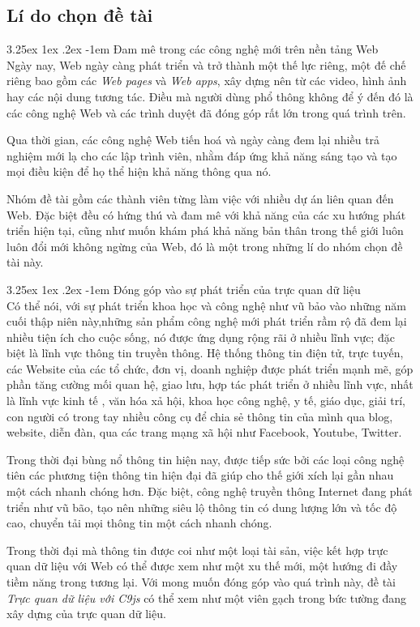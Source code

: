 \documentclass[12pt,a4paper,twoside]{article}
\makeatletter
\newcommand{\myparagraph}[1]{\paragraph{#1}\mbox{}\\} %
\renewcommand\paragraph{\@startsection{paragraph}{5}{\z@}%
  {3.25ex \@plus1ex \@minus.2ex}%
  {-1em}%
  {\normalfont\normalsize\bfseries}}
\makeatother
\begin{document}
\subsection{Lí do chọn đề tài}
\myparagraph{Đam mê trong các công nghệ mới trên nền tảng Web}
Ngày nay, \cite{web_evolution} Web ngày càng phát triển và trở thành một thế lực riêng, một đế chế riêng bao gồm các \textit{Web pages} và \textit{Web apps}, xây dựng nên từ các video, hình ảnh hay các nội dung tương tác. Điều mà người dùng phổ thông không để ý đến đó là các công nghệ Web và các trình duyệt đã đóng góp rất lớn trong quá trình trên.

Qua thời gian, các công nghệ Web tiến hoá và ngày càng đem lại nhiều trả nghiệm mới lạ cho các lập trình viên, nhằm đáp ứng khả năng sáng tạo và tạo mọi điều kiện để họ thể hiện khả năng thông qua nó. 

Nhóm đề tài gồm các thành viên từng làm việc với nhiều dự án liên quan đến Web. Đặc biệt đều có hứng thú và đam mê với khả năng của các xu hướng phát triển hiện tại, cũng như muốn khám phá khả năng bản thân trong thế giới luôn luôn đổi mới không ngừng của Web, đó là một trong những lí do nhóm chọn đề tài này.

\myparagraph{Đóng góp vào sự phát triển của trực quan dữ liệu}
\cite{technology_boom} Có thể nói, với sự phát triển khoa học và công nghệ như vũ bảo vào những năm cuối thập niên này,những sản phẩm công nghệ  mới phát triển rầm rộ đã đem lại nhiều tiện ích cho cuộc sống, nó được ứng dụng rộng rãi ở nhiều lĩnh vực; đặc biệt là lĩnh vực thông tin truyền thông. Hệ thống thông tin điện tử, trực tuyến, các Website của các tổ chức, đơn vị, doanh nghiệp được phát triển mạnh mẽ, góp phần tăng cường mối quan hệ, giao lưu, hợp tác phát triển ở nhiều lĩnh vực, nhất là lĩnh vực kinh tế , văn hóa xả hội, khoa học công nghệ, y tế, giáo dục, giải trí, con người có trong tay nhiều công cụ để chia sẻ thông tin của mình qua blog, website, diễn đàn, qua  các trang mạng xã hội như Facebook, Youtube, Twitter.

Trong thời đại bùng nổ thông tin hiện nay, được tiếp sức bởi các loại công nghệ tiên các phương tiện thông tin hiện đại đã giúp cho thế giới xích lại gần nhau một cách nhanh chóng hơn. Đặc biệt, công nghệ truyền thông Internet đang phát triển như vũ bão, tạo nên những siêu lộ thông tin có dung lượng lớn và tốc độ cao, chuyển tải mọi thông tin một cách nhanh chóng.

Trong thời đại mà thông tin được coi như một loại tài sản, việc kết hợp trực quan dữ liệu với Web có thể được xem như một xu thế mới, một hướng đi đầy tiềm năng trong tương lại. Với mong muốn đóng góp vào quá trình này, đề tài \textit{Trực quan dữ liệu với C9js} có thể xem như một viên gạch trong bức tường đang xây dựng của trực quan dữ liệu.
\end{document}
